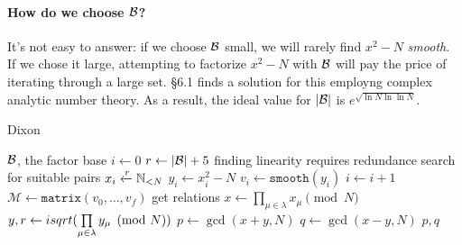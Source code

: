 \paragraph{How do we choose $\mathcal{B}$?}
It's not easy to answer: if we choose $\mathcal{B}$ small, we will rarely find
$x^2 -N$ \emph{smooth}. If we chose it large, attempting to factorize $x^2 -N$
with $\mathcal{B}$ will pay the price of iterating through a large set.
\cite{Crandall} \S 6.1 finds a solution for this employng complex analytic
number theory. As a  result, the ideal value for $|\mathcal{B}|$ is
$e^{\sqrt{\ln N \ln \ln N}}$.

\begin{algorithm}
  \caption{Dixon}
  \begin{algorithmic}[1]
    \Require $\mathcal{B}$, the factor base
    \State $i \gets 0$
    \State $r \gets |\mathcal{B}| + 5$
    \Comment finding linearity requires redundance
    \Comment search for suitable pairs
    \State $x_i \xleftarrow{r} \mathbb{N}_{< N}$
    \State $y_i \gets x_i^2 - N$
    \State $v_i \gets \texttt{smooth}(y_i)$
     $i \gets i+1$ \EndIf
  \EndWhile
  \State $\mathcal{M} \gets \texttt{matrix}(v_0, \ldots, v_f)$
  \Comment get relations
    \State $x \gets \prod\limits_{\mu \in \lambda} x_\mu \pmod{N}$
    \State $y, r \gets isqrt(\prod\limits_{\mu \in \lambda} y_\mu \pmod{N})$
      \State $p \gets \gcd(x+y, N)$
      \State $q \gets \gcd(x-y, N)$
      \State \Return $p, q$
    \EndIf
  \EndFor
  \EndFunction
  \end{algorithmic}
\end{algorithm}

